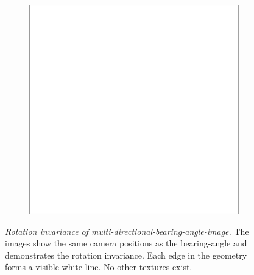 \begin{figure}[H]
\begin{subfigure}[t]{0.32\textwidth}
    \end{subfigure}
    \begin{subfigure}[t]{0.32\textwidth}
        \includegraphics[width=\linewidth]{chapter04/img/max-0210.png}
    \end{subfigure}
    \caption[Rotation invariance of \gls{multi-directional-bearing-angle-image}]{\emph{Rotation invariance of \gls{multi-directional-bearing-angle-image}.} The images show the same camera positions as the \gls{bearing-angle} and demonstrates the rotation invariance. Each edge in the geometry forms a visible white line. No other textures exist.}\label{fig:max-curve-images}
\end{figure}
\vspace{-5mm}
